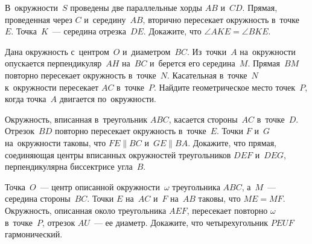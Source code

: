 \begin{problems}
\item
В~окружности~$S$ проведены две параллельные хорды $AB$ и~$CD$.
Прямая, проведенная через $C$ и~середину~$AB$, вторично пересекает окружность
в~точке~$E$.
Точка~$K$~--- середина отрезка~$DE$.
Докажите, что $\angle AKE = \angle BKE$.

\item
Дана окружность с~центром~$O$ и~диаметром~$BC$.
Из~точки~$A$ на~окружности опускается перпендикуляр~$AH$ на~$BC$ и~берется его
середина~$M$.
Прямая~$BM$ повторно пересекает окружность в~точке~$N$.
Касательная в~точке~$N$ к~окружности пересекает $AC$ в~точке~$P$.
Найдите геометрическое место точек~$P$, когда точка~$A$ двигается
по~окружности.

\item
Окружность, вписанная в~треугольник $ABC$, касается стороны~$AC$ в~точке~$D$.
Отрезок~$BD$ повторно пересекает окружность в~точке~$E$.
Точки $F$ и~$G$ на~окружности таковы, что $FE \parallel BC$
и~$GE \parallel BA$.
Докажите, что прямая, соединяющая центры вписанных окружностей треугольников
$DEF$ и~$DEG$, перпендикулярна биссектрисе угла~$B$.

\item
Точка~$O$~--- центр описанной окружности~$\omega$ треугольника $ABC$, а~$M$~---
середина стороны~$BC$.
Точки $E$ на~$AC$ и~$F$ на~$AB$ таковы, что $ME = MF$.
Окружность, описанная около треугольника $AEF$, пересекает повторно $\omega$
в~точке~$P$, отрезок $AU$~--- ее диаметр.
Докажите, что четырехугольник $PEUF$ гармонический.

\end{problems}

